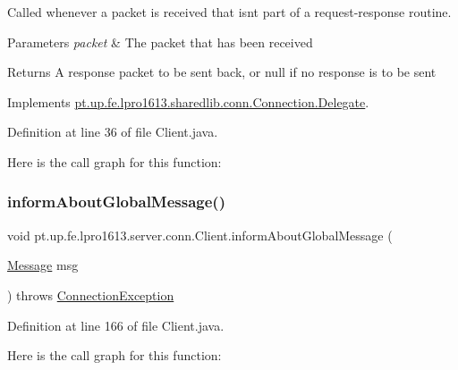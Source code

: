 Called whenever a packet is received that isn\textquotesingle{}t part of a request-\/response routine.


\begin{DoxyParams}{Parameters}
{\em packet} & The packet that has been received \\
\hline
\end{DoxyParams}
\begin{DoxyReturn}{Returns}
A response packet to be sent back, or null if no response is to be sent 
\end{DoxyReturn}


Implements \hyperlink{interfacept_1_1up_1_1fe_1_1lpro1613_1_1sharedlib_1_1conn_1_1_connection_1_1_delegate_a5b0f77e34d93967ae53cf7e01f0e2835}{pt.\+up.\+fe.\+lpro1613.\+sharedlib.\+conn.\+Connection.\+Delegate}.



Definition at line 36 of file Client.\+java.

Here is the call graph for this function\+:
\hypertarget{classpt_1_1up_1_1fe_1_1lpro1613_1_1server_1_1conn_1_1_client_aea2e952268afe16993958c8affb921cb}{}\label{classpt_1_1up_1_1fe_1_1lpro1613_1_1server_1_1conn_1_1_client_aea2e952268afe16993958c8affb921cb} 
\subsubsection{\texorpdfstring{inform\+About\+Global\+Message()}{informAboutGlobalMessage()}}
{\footnotesize\ttfamily void pt.\+up.\+fe.\+lpro1613.\+server.\+conn.\+Client.\+inform\+About\+Global\+Message (\begin{DoxyParamCaption}\item[{\hyperlink{classpt_1_1up_1_1fe_1_1lpro1613_1_1sharedlib_1_1tuples_1_1_message}{Message}}]{msg }\end{DoxyParamCaption}) throws \hyperlink{classpt_1_1up_1_1fe_1_1lpro1613_1_1sharedlib_1_1exceptions_1_1_connection_exception}{Connection\+Exception}}



Definition at line 166 of file Client.\+java.

Here is the call graph for this function\+:
\hypertarget{classpt_1_1up_1_1fe_1_1lpro1613_1_1server_1_1conn_1_1_client_a2d18ebb9809e36b016e9db24c8274522}{}\label{classpt_1_1up_1_1fe_1_1lpro1613_1_1server_1_1conn_1_1_client_a2d18ebb9809e36b016e9db24c8274522} 
